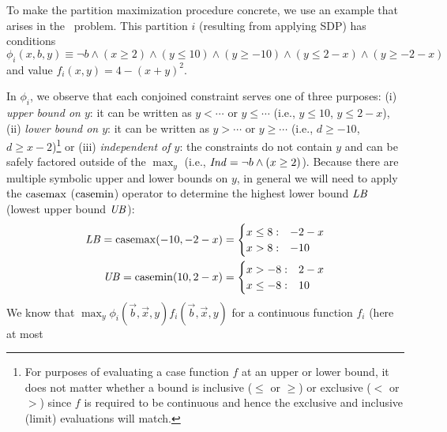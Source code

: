 To make the partition maximization procedure concrete, 
we use an example that arises in the \MarsRover\ problem.  
This partition $i$ (resulting
from applying SDP) has conditions $\phi_i(x,b,y) \equiv \neg b \wedge
(x\geq 2) \wedge (y\leq 10) \wedge (y\geq -10) \wedge (y\leq 2-x) \wedge
(y\geq -2-x)$ and value $f_i(x,y) = 4 - (x+y)^2 $.

In $\phi_i$, we observe that each conjoined constraint serves one of
three purposes: (i) \emph{upper bound on $y$}: it can be written
as $y < \cdots$ or $y \leq \cdots$ (i.e., $y \leq 10$, $y \leq 2 -
x$), (ii) \emph{lower bound on $y$}: it can be written as $y >
\cdots$ or $y \geq \cdots$ 
(i.e., $d \geq -10$, $d \geq x - 2$)\footnote{For purposes of evaluating
a case function $f$ at an upper or lower bound,
it does not matter whether a bound is inclusive ($\leq$ or $\geq$)
or exclusive ($<$ or $>$) since $f$ is required to be continuous
and hence the exclusive and inclusive (limit) evaluations  
will match.}
or (iii) \emph{independent of $y$}: the constraints do not contain $y$
and can be safely factored outside of the $\max_y$ (i.e., 
$\mathit{Ind} = \neg b \land (x \geq 2)$).  
Because there are multiple symbolic upper and lower
bounds on $y$, in general we will need to apply the $\mathrm{casemax}$
($\mathrm{casemin}$) operator to determine the highest lower bound $\mathit{LB}$
(lowest upper bound $\mathit{UB}$):
{\footnotesize
\begin{align*}
\mathit{LB} = \mathrm{casemax}(-10,-2 -x) & = \begin{cases}
x \leq 8: & -2 -x \\ 
x > 8: &-10\\ 
\end{cases}\\
\mathit{UB} = \mathrm{casemin}(10, 2-x) & = \begin{cases}
x > -8: & 2 -x \\ 
x \leq -8: &10\\ 
\end{cases}
\end{align*}
} We know that $\max_y \phi_i(\vec{b},\vec{x},y)
f_i(\vec{b},\vec{x},y)$ for a continuous function $f_i$ (here at most
